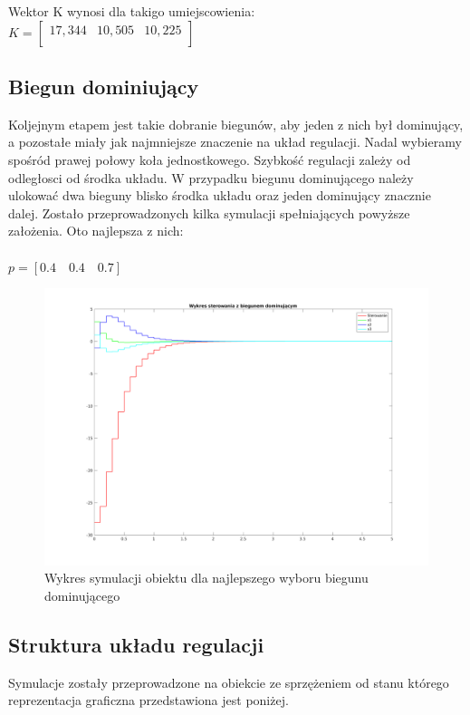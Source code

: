 \documentclass[a4paper, 11pt]{article}
\begin{document}
\noindent Wektor K wynosi dla takigo umiejscowienia:\\

$K= \left[
        \begin{array}{ccc}
         17,344&10,505&10,225\\
         \end{array}
      \right]$


\subsection{Biegun dominiujący}
Koljejnym etapem jest takie dobranie biegunów, aby jeden z nich był dominujący, a pozostałe miały jak najmniejsze znaczenie na układ regulacji. Nadal wybieramy spośród prawej połowy koła jednostkowego. Szybkość regulacji zależy od odległosci od środka układu. W przypadku biegunu dominującego należy ulokować dwa bieguny blisko środka układu oraz jeden dominujący znacznie dalej. Zostało przeprowadzonych kilka symulacji spełniających powyższe założenia. Oto najlepsza z nich:\\
\\

$p = [0.4\quad0.4\quad 0.7]$\\

\begin{figure}[H]
\centering
\includegraphics[scale=0.5]{3_d.png}
\caption{Wykres symulacji obiektu dla najlepszego wyboru biegunu dominującego}
\end{figure}


\subsection{Struktura układu regulacji} 
Symulacje zostały przeprowadzone na obiekcie ze sprzężeniem od stanu którego reprezentacja graficzna przedstawiona jest poniżej. 
\end{document}
